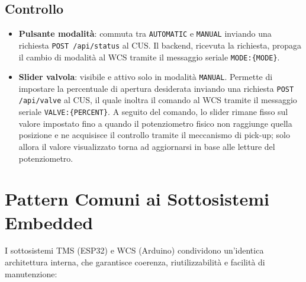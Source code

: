 \documentclass[12pt, a4paper]{article}
\begin{document}
\subsection{Controllo}

\begin{itemize}
    \item \textbf{Pulsante modalità}: commuta tra \texttt{AUTOMATIC} e \texttt{MANUAL} inviando una richiesta \texttt{POST /api/status} al CUS. Il backend, ricevuta la richiesta, propaga il cambio di modalità al WCS tramite il messaggio seriale \texttt{MODE:\{MODE\}}.
    \item \textbf{Slider valvola}: visibile e attivo solo in modalità \texttt{MANUAL}. Permette di impostare la percentuale di apertura desiderata inviando una richiesta \texttt{POST /api/valve} al CUS, il quale inoltra il comando al WCS tramite il messaggio seriale \texttt{VALVE:\{PERCENT\}}. A seguito del comando, lo slider rimane fisso sul valore impostato fino a quando il potenziometro fisico non raggiunge quella posizione e ne acquisisce il controllo tramite il meccanismo di pick-up; solo allora il valore visualizzato torna ad aggiornarsi in base alle letture del potenziometro.
\end{itemize}

\section{Pattern Comuni ai Sottosistemi Embedded}

I sottosistemi TMS (ESP32) e WCS (Arduino) condividono un'identica architettura interna, che garantisce coerenza, riutilizzabilità e facilità di manutenzione:
\end{document}
